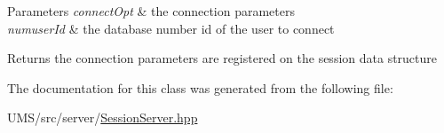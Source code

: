 \begin{DoxyParams}{Parameters}
{\em connectOpt} & the connection parameters \\
\hline
{\em numuserId} & the database number id of the user to connect \\
\hline
\end{DoxyParams}
\begin{DoxyReturn}{Returns}
the connection parameters are registered on the session data structure 
\end{DoxyReturn}


The documentation for this class was generated from the following file:\begin{DoxyCompactItemize}
\item 
UMS/src/server/\hyperlink{SessionServer_8hpp}{SessionServer.hpp}\end{DoxyCompactItemize}
